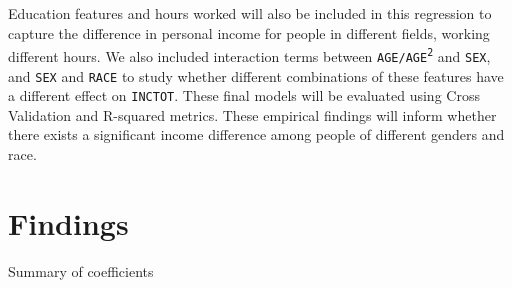 \documentclass{article}
\begin{document}
Education features and hours worked will also be included in this regression to capture the difference in personal income for people in different fields, working different hours. We also included interaction terms between \texttt{AGE/AGE\textsuperscript{2}} and \texttt{SEX}, and  \texttt{SEX} and \texttt{RACE} to study whether different combinations of these features have a different effect on \texttt{INCTOT}.  These final models will be evaluated using Cross Validation and R-squared metrics. These empirical findings will inform whether there exists a significant income difference among people of different genders and race. 
\newpage
\section*{Findings}
\begin{table}[ht]
    \centering

    Summary of coefficients


\end{table}
\end{document}
